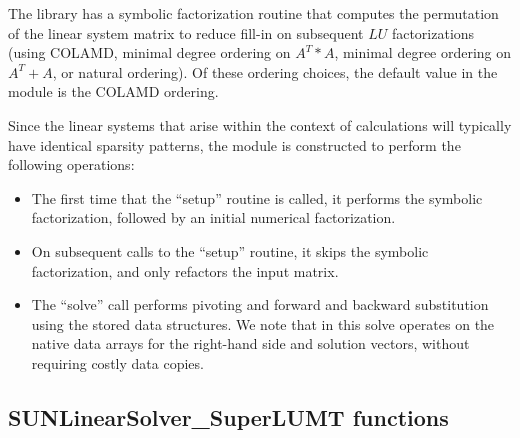 The {\superlumt} library has a symbolic factorization routine that
computes the permutation of the linear system matrix to reduce fill-in
on subsequent $LU$ factorizations (using COLAMD, minimal degree
ordering on $A^T*A$, minimal degree ordering on $A^T+A$, or natural
ordering).  Of these ordering choices, the default value in the
{\sunlinsolslumt} module is the COLAMD ordering.

Since the linear systems that arise within the context of {\sundials}
calculations will typically have identical sparsity patterns, the
{\sunlinsolslumt} module is constructed to perform the
following operations:
\begin{itemize}
\item The first time that the ``setup'' routine is called, it
  performs the symbolic factorization, followed by an initial
  numerical factorization.
\item On subsequent calls to the ``setup'' routine, it skips the
  symbolic factorization, and only refactors the input matrix.
\item The ``solve'' call performs pivoting and forward and
  backward substitution using the stored {\superlumt} data
  structures.  We note that in this solve {\superlumt} operates on the
  native data arrays for the right-hand side and solution vectors,
  without requiring costly data copies.
\end{itemize}


\subsection{SUNLinearSolver\_SuperLUMT functions}
\label{ss:sunlinsol_slumt_functions}


